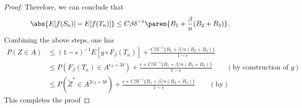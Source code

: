 \documentclass[uplatex,dvipdfmx]{jsarticle}
\begin{document}
\begin{proof}
    Therefore, we can conclude that
    \begin{equation*}
        \abs{E[ f(S_n)] - E[ f(T_n)]} \leq C \beta \delta^{-1} \paren{B_1 + \frac{\beta}{n} ( B_2 + B_3)}.
    \end{equation*}
    Combining the above steps, one has \begin{align*}
        P(Z \in A) &\leq ( 1 - \epsilon)^{-1} E[ g \circ F_\beta ( T_n)] + \frac { C \beta \delta^{-1} \{ B_1 + \beta /n ( B_2 + B_3) \}}{ 1 - \epsilon } \\
        &\leq P( F_ \beta (T_n) \in A^{ e_\beta + 3 \delta }) + \frac { \epsilon + C \beta \delta^{-1} \{ B_1 + \beta /n ( B_2 + B_3) \}}{ 1 - \epsilon }\qquad(\text{by construction of }g)\\
        &\leq P( \tilde{Z}^* \in A^{ 2 e_\beta + 3 \delta}) + \frac {\epsilon + C \beta \delta^{-1} \{ B_1 + \beta /n ( B_2 + B_3) \}}{ 1 - \epsilon } \qquad(\text{by} )
    \end{align*}
    This completes the proof
\end{proof}
    
\end{document}
